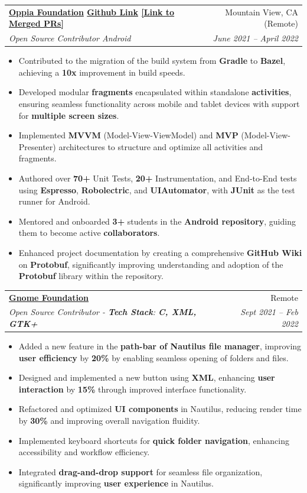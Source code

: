 \documentclass[letterpaper,1pt]{article}
\makeatletter
\newcommand{\resumeItem}[1]{
  \item\small{
    #1 \vspace{1pt}
  }
}
\newcommand{\resumeSubheading}[4]{
  \item
    \begin{tabular*}{0.97\textwidth}{l@{\extracolsep{\fill}}r}
      \textbf{#1} & #2 \\
      \textit{\small#3} & \textit{\small #4} \\
    \end{tabular*}
}
\newcommand{\resumeItemListStart}{\vspace{1pt}\begin{itemize}[leftmargin=8pt,itemsep=1pt,parsep=0pt]
  \selectfont\small
  \setlength\itemsep{0em}
  \setlength\parsep{0em}
  }
\newcommand{\resumeItemListEnd}{\end{itemize}}
\makeatother
\begin{document}
\resumeSubheading
{\href{https://oppia.org}{Oppia Foundation} \href{https://github.com/oppia/oppia-android}{Github Link} \href{https://github.com/oppia/oppia-android/commits?author=yash10019coder}{[Link to Merged PRs]}}{Mountain View, CA (Remote)}
{Open Source Contributor Android}{June 2021 -- April 2022}
\resumeItemListStart
\resumeItem{Contributed to the migration of the build system from \textbf{Gradle} to \textbf{Bazel}, achieving a \textbf{10x} improvement in build speeds.}
\resumeItem{Developed modular \textbf{fragments} encapsulated within standalone \textbf{activities}, ensuring seamless functionality across mobile and tablet devices with support for \textbf{multiple screen sizes}.}
\resumeItem{Implemented \textbf{MVVM} (Model-View-ViewModel) and \textbf{MVP} (Model-View-Presenter) architectures to structure and optimize all activities and fragments.}
\resumeItem{Authored over \textbf{70+} Unit Tests, \textbf{20+} Instrumentation, and End-to-End tests using \textbf{Espresso}, \textbf{Robolectric}, and \textbf{UIAutomator}, with \textbf{JUnit} as the test runner for Android.}
\resumeItem{Mentored and onboarded \textbf{3+} students in the \textbf{Android repository}, guiding them to become active \textbf{collaborators}.}
\resumeItem{Enhanced project documentation by creating a comprehensive \textbf{GitHub Wiki} on \textbf{Protobuf}, significantly improving understanding and adoption of the \textbf{Protobuf} library within the repository.}
\resumeItemListEnd

\resumeSubheading
{\href{https://gnome.org}{Gnome Foundation}}{Remote}
{Open Source Contributor - \textbf{Tech Stack}: \textbf{C, XML, GTK+}}{Sept 2021 -- Feb 2022}
\resumeItemListStart
\resumeItem {Added a new feature in the \textbf{path-bar of Nautilus file manager}, improving \textbf{user efficiency} by \textbf{20\%} by enabling seamless opening of folders and files.}
\resumeItem {Designed and implemented a new button using \textbf{XML}, enhancing \textbf{user interaction} by \textbf{15\%} through improved interface functionality.}
\resumeItem{Refactored and optimized \textbf{UI components} in Nautilus, reducing render time by \textbf{30\%} and improving overall navigation fluidity.}
\resumeItem{Implemented keyboard shortcuts for \textbf{quick folder navigation}, enhancing accessibility and workflow efficiency.}
\resumeItem{Integrated \textbf{drag-and-drop support} for seamless file organization, significantly improving \textbf{user experience} in Nautilus.}
\resumeItemListEnd
\end{document}
